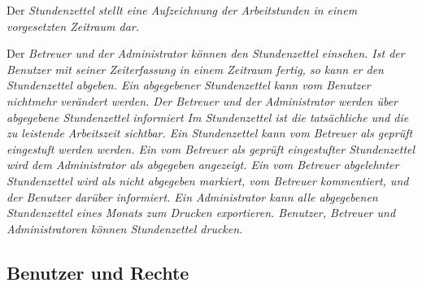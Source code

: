 \begin{requirements}
    Der \em{Stundenzettel} stellt eine Aufzeichnung der Arbeitstunden in einem vorgesetzten Zeitraum dar.
    \begin{requirements}
         Der \em{Betreuer} und der \em{Administrator} können den Stundenzettel einsehen.
         Ist der \em{Benutzer} mit seiner \em{Zeiterfassung} in einem Zeitraum fertig, so kann er den \em{Stundenzettel abgeben}.
         Ein \em{abgegebener Stundenzettel} kann vom \em{Benutzer} nichtmehr verändert werden.
         Der \em{Betreuer} und der \em{Administrator} werden über \em{abgegebene Stundenzettel} informiert
         Im \em{Stundenzettel} ist die tatsächliche und die zu leistende Arbeitszeit sichtbar.
         Ein \em{Stundenzettel} kann vom \em{Betreuer} als \em{geprüft} eingestuft werden werden.
         Ein vom \em{Betreuer} als \em{geprüft} eingestufter \em{Stundenzettel} wird dem \em{Administrator} als \em{abgegeben} angezeigt.
         Ein vom \em{Betreuer} abgelehnter \em{Stundenzettel} wird als \em{nicht abgegeben} markiert, vom \em{Betreuer} kommentiert, und der \em{Benutzer} darüber informiert.
         Ein \em{Administrator} kann alle \em{abgegebenen Stundenzettel} eines Monats zum Drucken exportieren.
        \em{Benutzer}, \em{Betreuer} und \em{Administratoren} können \em{Stundenzettel} drucken.
    \end{requirements}

\end{requirements}

\subsection{Benutzer und Rechte}

